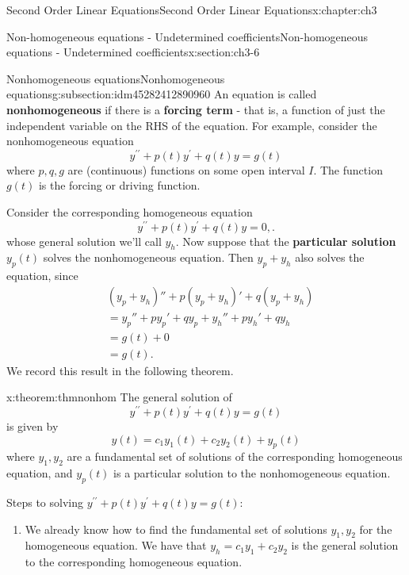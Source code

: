 \documentclass[oneside,10pt,]{book}
\newcommand{\terminology}[1]{\textbf{#1}}
\numberwithin{equation}{section}
\numberwithin{equation}{section}
\newcommand{\amp}{&}
\begin{document}
\begin{chapterptx}{Second Order Linear Equations}{}{Second Order Linear Equations}{}{}{x:chapter:ch3}
\begin{sectionptx}{Non-homogeneous equations - Undetermined coefficients}{}{Non-homogeneous equations - Undetermined coefficients}{}{}{x:section:ch3-6}
\typeout{************************************************}
%
\begin{subsectionptx}{Nonhomogeneous equations}{}{Nonhomogeneous equations}{}{}{g:subsection:idm45282412890960}
An equation is called \terminology{nonhomogeneous} if there is a \terminology{forcing term} - that is, a function of just the independent variable on the RHS of the equation. For example, consider the nonhomogeneous equation%
\begin{equation*}
y^{\prime\prime}+p(t)y^{\prime}+q(t)y=g(t)
\end{equation*}
where \(p,q,g\) are (continuous) functions on some open interval \(I\). The function \(g(t)\) is the forcing or driving function.%
\par
Consider the corresponding homogeneous equation%
\begin{equation*}
y^{\prime\prime}+p(t)y^{\prime}+q(t)y=0,.
\end{equation*}
whose general solution we'll call \(y_{h}\). Now suppose that the \terminology{particular solution} \(y_p(t)\) solves the nonhomogeneous equation. Then \(y_p + y_h\) also solves the equation, since%
\begin{align*}
\amp(y_p + y_h)'' + p(y_p + y_h)' + q(y_p + y_h)\\
\amp= y_p'' + py_p' +q y_p + y_h'' +p y_h' + qy_h \\
\amp= g(t) + 0 \\
\amp= g(t).
\end{align*}
We record this result in the following theorem.%
\begin{theorem}{}{}{x:theorem:thmnonhom}%
The general solution of%
\begin{equation*}
y^{\prime\prime}+p(t)y^{\prime}+q(t)y=g(t)
\end{equation*}
is given by%
\begin{equation*}
y(t)=c_{1}y_{1}(t)+c_{2}y_{2}(t)+y_{p}(t)
\end{equation*}
where \(y_{1},y_{2}\) are a fundamental set of solutions of the corresponding homogeneous equation, and \(y_{p}(t)\) is a particular solution to the nonhomogeneous equation.%
\end{theorem}
Steps to solving \(y^{\prime\prime}+p(t)y^{\prime}+q(t)y=g(t):\)%
\begin{enumerate}
\item{}We already know how to find the fundamental set of solutions \(y_{1},y_{2}\) for the homogeneous equation. We have that \(y_{h}=c_{1}y_{1}+c_{2}y_{2}\) is the general solution to the corresponding homogeneous equation.%

\end{enumerate}
\end{subsectionptx}
\end{sectionptx}
\end{chapterptx}
\end{document}
